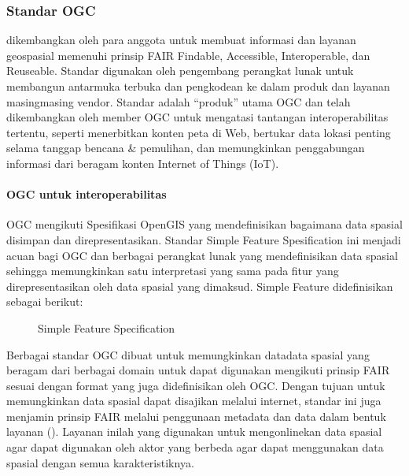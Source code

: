 \documentclass[letterpaper,10pt,english]{sphinxmanual}
\let\sphinxpxdimen\pdfpxdimen\else\newdimen\sphinxpxdimen
\begin{document}
\subsubsection{Standar OGC}
\label{\detokenize{sesi3/interoperabilitas:standar-ogc}}
 dikembangkan oleh para anggota untuk membuat informasi dan layanan geospasial memenuhi prinsip FAIR \sphinxhyphen{} Findable, Accessible, Interoperable, dan Reuseable. Standar digunakan oleh pengembang perangkat lunak untuk membangun antarmuka terbuka dan pengkodean ke dalam produk dan layanan masing\sphinxhyphen{}masing vendor. Standar adalah “produk” utama OGC dan telah dikembangkan oleh member OGC untuk mengatasi tantangan interoperabilitas tertentu, seperti menerbitkan konten peta di Web, bertukar data lokasi penting selama tanggap bencana \& pemulihan, dan memungkinkan penggabungan informasi dari beragam konten Internet of Things (IoT).


\paragraph{OGC untuk interoperabilitas}
\label{\detokenize{sesi3/interoperabilitas:ogc-untuk-interoperabilitas}}
OGC mengikuti Spesifikasi OpenGIS yang mendefinisikan bagaimana data spasial disimpan dan direpresentasikan. Standar Simple Feature Spesification ini menjadi acuan bagi OGC dan berbagai perangkat lunak yang mendefinisikan data spasial sehingga memungkinkan satu interpretasi yang sama pada fitur yang direpresentasikan oleh data spasial yang dimaksud. Simple Feature didefinisikan sebagai berikut:

\begin{figure}[htbp]
\centering
\capstart

\noindent\sphinxincludegraphics[height=300\sphinxpxdimen]{{2020-12-04-03-48-23}.png}
\caption{Simple Feature Specification}\label{\detokenize{sesi3/interoperabilitas:sfs}}\end{figure}

Berbagai standar OGC dibuat untuk memungkinkan data\sphinxhyphen{}data spasial yang beragam dari berbagai domain untuk dapat digunakan mengikuti prinsip FAIR sesuai dengan format yang juga didefinisikan oleh OGC. Dengan tujuan untuk memungkinkan data spasial dapat disajikan melalui internet, standar ini juga menjamin prinsip FAIR melalui penggunaan metadata dan data dalam bentuk layanan (). Layanan inilah yang digunakan untuk meng\sphinxhyphen{}onlinekan data spasial agar dapat digunakan oleh aktor yang berbeda agar dapat menggunakan data spasial dengan semua karakteristiknya.
\end{document}
